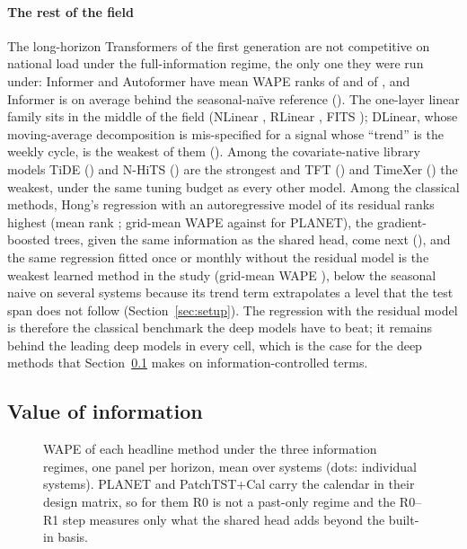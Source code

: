 \paragraph{The rest of the field} The long-horizon Transformers of the first generation are
not competitive on national load under the full-information regime, the only one they were
run under: Informer and Autoformer have mean WAPE
ranks of  and  of
, and Informer is on average behind the seasonal-na\"ive reference
(). The one-layer linear family sits in the middle of the
field (NLinear , RLinear , FITS
); DLinear, whose moving-average decomposition is mis-specified
for a signal whose ``trend'' is the weekly cycle, is the weakest of them
(). Among the covariate-native library models TiDE
() and N-HiTS () are the strongest and
TFT () and TimeXer () the weakest,
under the same tuning budget as every other model. Among the classical methods, Hong's regression with an autoregressive model of its
residual ranks highest (mean rank ; grid-mean WAPE
 against  for PLANET), the
gradient-boosted trees, given the same information as the shared head, come next
(), and the same regression fitted once or monthly without the
residual model is the weakest learned method in the study (grid-mean WAPE
), below the seasonal naive on several systems because its trend
term extrapolates a level that the test span does not follow (Section~\ref{sec:setup}). The
regression with the residual model is therefore the classical benchmark the deep models have
to beat; it remains behind the leading deep models in every cell, which is the case for the deep methods that
Section~\ref{sec:info} makes on information-controlled terms.

\subsection{Value of information}
\label{sec:info}
\begin{figure}[!t]
\centering
{}
\caption{WAPE of each headline method under the three information regimes, one panel per
horizon, mean over systems (dots: individual systems). PLANET and PatchTST+Cal carry the
calendar in their design matrix, so for them R0 is not a past-only regime and the R0--R1 step
measures only what the shared head adds beyond the built-in basis.}
\label{fig:regimes}
\end{figure}

